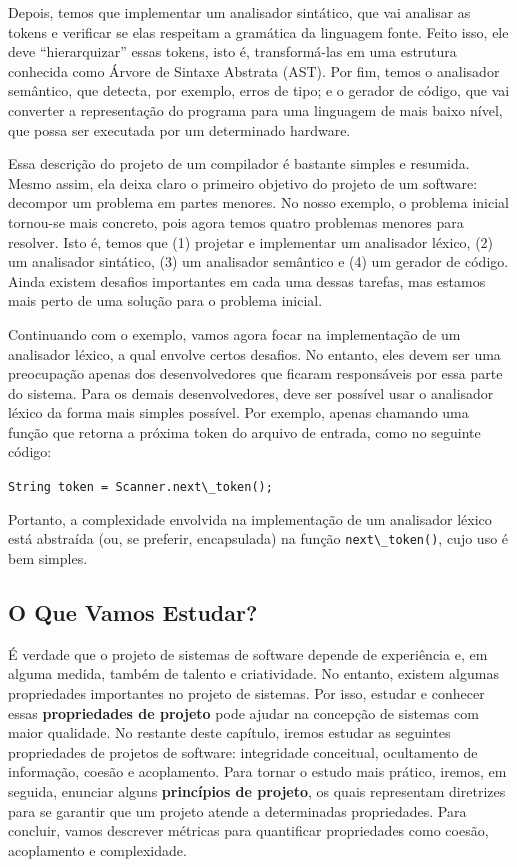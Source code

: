 \documentclass[
  11pt,
  twoside]{book}
\newcommand{\passthrough}[1]{#1}
\begin{document}
Depois, temos que implementar um analisador sintático, que vai analisar
as tokens e verificar se elas respeitam a gramática da linguagem fonte.
Feito isso, ele deve ``hierarquizar'' essas tokens, isto é,
transformá-las em uma estrutura conhecida como Árvore de Sintaxe
Abstrata (AST). Por fim, temos o analisador semântico, que detecta, por
exemplo, erros de tipo; e o gerador de código, que vai converter a
representação do programa para uma linguagem de mais baixo nível, que
possa ser executada por um determinado hardware.

Essa descrição do projeto de um compilador é bastante simples e
resumida. Mesmo assim, ela deixa claro o primeiro objetivo do projeto de
um software: decompor um problema em partes menores. No nosso exemplo, o
problema inicial tornou-se mais concreto, pois agora temos quatro
problemas menores para resolver. Isto é, temos que (1) projetar e
implementar um analisador léxico, (2) um analisador sintático, (3) um
analisador semântico e (4) um gerador de código. Ainda existem desafios
importantes em cada uma dessas tarefas, mas estamos mais perto de uma
solução para o problema inicial.

Continuando com o exemplo, vamos agora focar na implementação de um
analisador léxico, a qual envolve certos desafios. No entanto, eles
devem ser uma preocupação apenas dos desenvolvedores que ficaram
responsáveis por essa parte do sistema. Para os demais desenvolvedores,
deve ser possível usar o analisador léxico da forma mais simples
possível. Por exemplo, apenas chamando uma função que retorna a próxima
token do arquivo de entrada, como no seguinte código:

\passthrough{\lstinline!String token = Scanner.next\_token();!}

Portanto, a complexidade envolvida na implementação de um analisador
léxico está abstraída (ou, se preferir, encapsulada) na função
\passthrough{\lstinline!next\_token()!}, cujo uso é bem simples.

\hypertarget{o-que-vamos-estudar-1}{%
\subsection{O Que Vamos Estudar?}\label{o-que-vamos-estudar-1}}

 

É verdade que o projeto de sistemas de software depende de experiência
e, em alguma medida, também de talento e criatividade. No entanto,
existem algumas propriedades importantes no projeto de sistemas. Por
isso, estudar e conhecer essas \textbf{propriedades de projeto} pode
ajudar na concepção de sistemas com maior qualidade. No restante deste
capítulo, iremos estudar as seguintes propriedades de projetos de
software: integridade conceitual, ocultamento de informação, coesão e
acoplamento. Para tornar o estudo mais prático, iremos, em seguida,
enunciar alguns \textbf{princípios de projeto}, os quais representam
diretrizes para se garantir que um projeto atende a determinadas
propriedades. Para concluir, vamos descrever métricas para quantificar
propriedades como coesão, acoplamento e complexidade.
\end{document}

